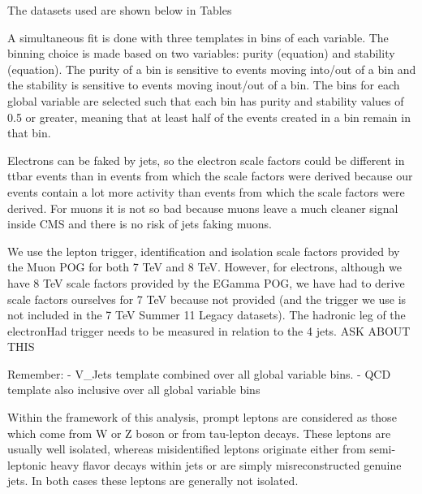 The datasets used are shown below in Tables~%

A simultaneous fit is done with three templates in bins of each variable.
The binning choice is made based on two variables: purity (equation) and stability (equation). The purity of a
bin is sensitive to events moving into/out of a bin and the stability is sensitive to events moving inout/out
of a bin. The bins for each global variable are selected such that each bin has purity and stability values of
0.5 or greater, meaning that at least half of the events created in a bin remain in that bin.
	
Electrons can be faked by jets, so the electron scale factors could be different in ttbar events than in
events from which the scale factors were derived because our events contain a lot more activity than events
from which the scale factors were derived.
For muons it is not so bad because muons leave a much cleaner signal inside CMS and there is no risk of jets
faking muons.
	
We use the lepton trigger, identification and isolation scale factors provided by the Muon POG for both 7 TeV
and 8 TeV. However, for electrons, although we have 8 TeV scale factors provided by the EGamma POG, we have
had to derive scale factors ourselves for 7 TeV because not provided (and the trigger we use is not included
in the 7 TeV Summer 11 Legacy datasets).
The hadronic leg of the electronHad trigger needs to be measured in relation to the 4 jets. ASK ABOUT THIS
	 
Remember:
- V\_Jets template combined over all global variable bins.
- QCD template also inclusive over all global variable bins
	
Within the framework of this analysis, prompt leptons are considered as those which come
from W or Z boson or from tau-lepton decays. These leptons are usually well isolated, whereas
misidentified leptons originate either from semi-leptonic heavy flavor decays within jets or are
simply misreconstructed genuine jets. In both cases these leptons are generally not isolated.

